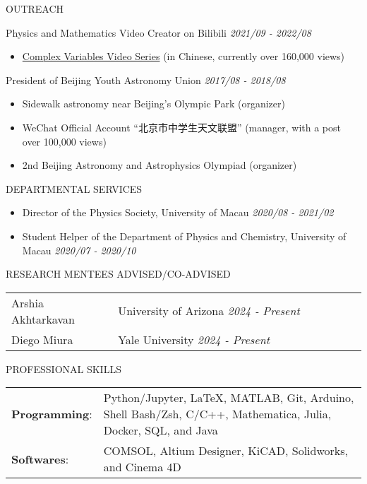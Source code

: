 \documentclass[11pt]{article} %
\begin{document}
\begin{section}{OUTREACH}

Physics and Mathematics Video Creator on Bilibili \hfill \textit{2021/09 - 2022/08}
\begin{itemize}[leftmargin=1.5em]
    \item \href{https://www.bilibili.com/video/BV1th411W7xu/}{Complex Variables Video Series} (in Chinese, currently over 160,000 views) 
\end{itemize}

President of Beijing Youth Astronomy Union \hfill \textit{2017/08 - 2018/08} 
\begin{itemize}[leftmargin=1.5em]
    \item Sidewalk astronomy near Beijing's Olympic Park (organizer)
    \item WeChat Official Account ``北京市中学生天文联盟'' (manager, with a post over 100,000 views)
    \item 2nd Beijing Astronomy and Astrophysics Olympiad (organizer) 
\end{itemize}

\end{section}

\begin{section}{DEPARTMENTAL SERVICES}
    
\begin{itemize}[leftmargin=1.5em]
    \item Director of the Physics Society, University of Macau \hfill \textit{2020/08 - 2021/02}
    \item Student Helper of the Department of Physics and Chemistry, University of Macau \hfill \textit{2020/07 - 2020/10} 
\end{itemize}

\end{section}

\begin{section}{RESEARCH MENTEES ADVISED/CO-ADVISED}

\begin{tabular}{@{}p{0.3\linewidth}@{}p{0.7\linewidth}@{}}
    Arshia Akhtarkavan & University of Arizona \hfill \textit{2024 - Present} \\
    Diego Miura & Yale University \hfill \textit{2024 - Present} \\
\end{tabular}

\end{section}

\begin{section}{PROFESSIONAL SKILLS}

\begin{tabular}{@{}p{0.2\linewidth}@{}p{0.8\linewidth}@{}}
    \textbf{Programming}: & Python/Jupyter, \LaTeX, MATLAB, Git, Arduino, Shell Bash/Zsh, C/C++, Mathematica, Julia, Docker, SQL, and Java \\
    \textbf{Softwares}: & COMSOL, Altium Designer, KiCAD, Solidworks, and Cinema 4D \\
\end{tabular}
    
\end{section} 
\end{document}
